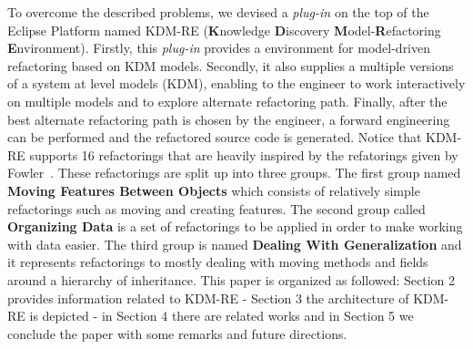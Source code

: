 To overcome the described problems, we devised a \textit{plug-in} on the top of the Eclipse Platform named KDM-RE (\textbf{K}nowledge \textbf{D}iscovery \textbf{M}odel-\textbf{R}efactoring \textbf{E}nvironment). Firstly, this \textit{plug-in} provides a environment for model-driven refactoring based on KDM models. Secondly, it also supplies a multiple versions of a system at level models (KDM), enabling to the engineer  to work interactively on multiple models and to explore alternate refactoring path. Finally, after the best alternate refactoring path is chosen by the engineer, a forward engineering can be performed and the refactored source code is generated. Notice that KDM-RE supports 16 refactorings that are heavily inspired by the refatorings given by Fowler~\cite{aqui}. These refactorings are split up into three groups. The first group named \textbf{Moving Features Between Objects} which consists of relatively simple refactorings such as moving and creating features. The second group called \textbf{Organizing Data} is a set of refactorings to be applied in order to make working with data easier. The third group is named \textbf{Dealing With Generalization} and it represents refactorings to mostly dealing with moving methods and fields around a hierarchy of inheritance. This paper is organized as followed: Section 2 provides information related to KDM-RE - Section 3 the architecture of KDM-RE is depicted - in Section 4 there are related works and in Section 5 we conclude the paper with some remarks and future directions.





